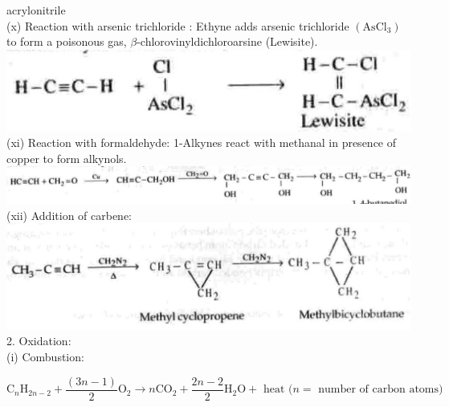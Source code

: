 \documentclass[10pt]{article}
\begin{document}
acrylonitrile\\
(x) Reaction with arsenic trichloride : Ethyne adds arsenic trichloride $\left(\mathrm{AsCl}_{3}\right)$ to form a poisonous gas, $\beta$-chlorovinyldichloroarsine (Lewisite).\\
\includegraphics[max width=\textwidth, center]{2025_01_28_8470952b98110cec3aabg-191(3)}\\
(xi) Reaction with formaldehyde: 1-Alkynes react with methanal in presence of copper to form alkynols.\\
\includegraphics[max width=\textwidth, center]{2025_01_28_8470952b98110cec3aabg-191(6)}\\
(xii) Addition of carbene:\\
\includegraphics[max width=\textwidth, center]{2025_01_28_8470952b98110cec3aabg-191}\\
2. Oxidation:\\
(i) Combustion:

$$
\mathrm{C}_{n} \mathrm{H}_{2 n-2}+\frac{(3 n-1)}{2} \mathrm{O}_{2} \longrightarrow n \mathrm{CO}_{2}+\frac{2 n-2}{2} \mathrm{H}_{2} \mathrm{O}+\text { heat }(n=\text { number of carbon atoms) }
$$
\end{document}
